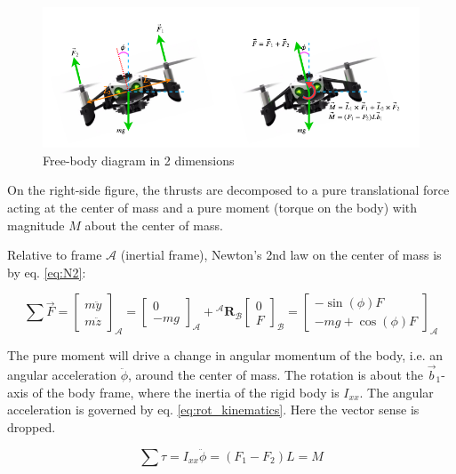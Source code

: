 \documentclass[a4paper]{report}
\newcommand{\matr}[1]{\mathbf{#1}}
\begin{document}
\begin{figure}[H]
\centering
\includegraphics[width=15.5cm]{img/fbd_planar.png}
\caption{Free-body diagram in 2 dimensions\label{fig:fbd_planar}}
\end{figure}

On the right-side figure, the thrusts are decomposed to a pure translational force acting at the center of mass 
and a pure moment (torque on the body) with magnitude $M$ about the center of mass. 

Relative to frame $\mathcal{A}$ (inertial frame), Newton's 2nd law on the center of mass is by eq. \ref{eq:N2}:

\begin{equation}
\sum \vec{F} = 
\begin{bmatrix}
m\ddot{y} \\
m\ddot{z}
\end{bmatrix}_\mathcal{A}
=
\begin{bmatrix}
0 \\
-mg
\end{bmatrix}_\mathcal{A}
+
\matr{^\mathcal{A}R_\mathcal{B}} 
\begin{bmatrix}
  0\\
  F
\end{bmatrix}_\mathcal{B} 
= 
\begin{bmatrix}
  - \sin(\phi) F\\
  -mg + \cos(\phi) F
\end{bmatrix}_\mathcal{A} 
\end{equation}

The pure moment will drive a change in angular momentum of the body, i.e. an angular acceleration $\ddot{\phi}$, around the center of mass. The rotation is about the $\vec{b}_1$-axis of the body frame, where the inertia of the rigid body is $I_{xx}$. The angular acceleration is governed by eq. \ref{eq:rot_kinematics}. Here the vector sense is dropped.

\begin{equation}
\sum \tau = I_{xx} \ddot{\phi} = (F_1-F_2)L = M
\end{equation}
\end{document}
